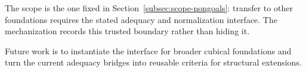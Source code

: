 \documentclass{lmcs}
\begin{document}
The scope is the one fixed in Section~\ref{subsec:scope-nongoals}: transfer to
other foundations requires the stated adequacy and normalization interface.  The
mechanization records this trusted boundary rather than hiding it.

Future work is to instantiate the interface for broader cubical foundations
and turn the current adequacy bridges into reusable criteria for structural
extensions.





\end{document}
